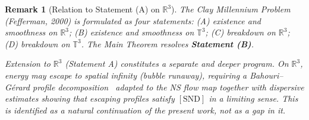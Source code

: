 \documentclass[11pt]{article}
\newtheorem*{remark}{Remark}
\newcommand{\T}{\mathbb{T}}
\newcommand{\R}{\mathbb{R}}
\begin{document}
\begin{remark}[Relation to Statement (A) on $\R^3$]
\label{rem:R3}
The Clay Millennium Problem (Fefferman, 2000) is formulated as four
statements: (A) existence and smoothness on $\R^3$;
(B) existence and smoothness on $\T^3$; (C) breakdown on $\R^3$;
(D) breakdown on $\T^3$.
The Main Theorem resolves \textbf{Statement (B)}.

Extension to $\R^3$ (Statement A) constitutes a separate and deeper
program. On $\R^3$, energy may escape to spatial infinity
(\emph{bubble runaway}), requiring a Bahouri--G\'erard profile
decomposition~\cite{BG1999} adapted to the NS flow map together with
dispersive estimates showing that escaping profiles satisfy $[\mathrm{SND}]$
in a limiting sense. This is identified as a natural continuation of
the present work, not as a gap in it.
\end{remark}
\end{document}
